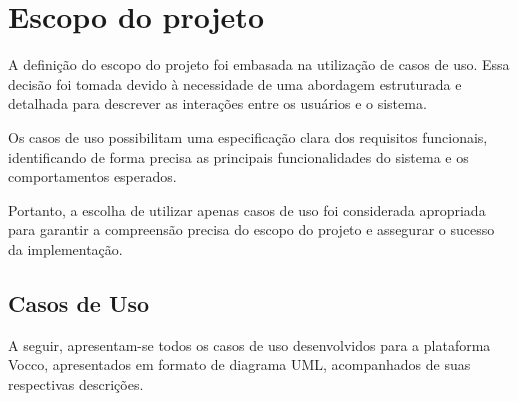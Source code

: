 \section{Escopo do projeto}
A definição do escopo do projeto foi embasada na utilização de casos de uso. Essa decisão foi tomada devido à necessidade de uma abordagem estruturada e detalhada para descrever as interações entre os usuários e o sistema. 

Os casos de uso possibilitam uma especificação clara dos requisitos funcionais, identificando de forma precisa as principais funcionalidades do sistema e os comportamentos esperados. 

Portanto, a escolha de utilizar apenas casos de uso foi considerada apropriada para garantir a compreensão precisa do escopo do projeto e assegurar o sucesso da implementação.
\subsection{Casos de Uso}
A seguir, apresentam-se todos os casos de uso desenvolvidos para a plataforma Vocco, apresentados em formato de diagrama UML, acompanhados de suas respectivas descrições.

